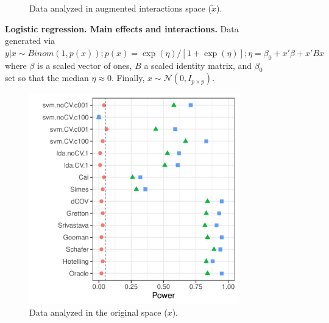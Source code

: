 \documentclass[oupdraft]{bio}
\begin{document}
\begin{figure}[th]
\begin{subfigure}[t]{.45\columnwidth}
		\caption{Data analyzed in augmented interactions space ($\tilde x$).}
		\label{fig:interactions-in-augmented-space}
	\end{subfigure}
	\caption{\textbf{Logistic regression. Main effects and interactions.} 
		Data generated via $y|x \sim Binom(1,p(x));
		p(x)=\exp(\eta)/[1+\exp(\eta)];
		\eta=\beta_0 + x'\beta + x'Bx$ where 
		$\beta$ is a scaled vector of ones, 
		$B$ a scaled identity matrix, and $\beta_0$ set so that the median $\eta \approx0$.
		Finally, $x\sim \mathcal{N}(0,I_{p\times p})$. } 
	\label{fig:logistic-main-and-interactions}
\end{figure}





\begin{figure}[th]
	\centering
	\begin{subfigure}[t]{.45\columnwidth}
		\centering
		\includegraphics[width=1\columnwidth]{"file40"}
		\caption{Data analyzed in the original space ($x$).}
		\label{fig:main-only-original-space}
	\end{subfigure}
	\begin{subfigure}[t]{.45\columnwidth}
		\centering

\end{subfigure}
\end{figure}
\end{document}
